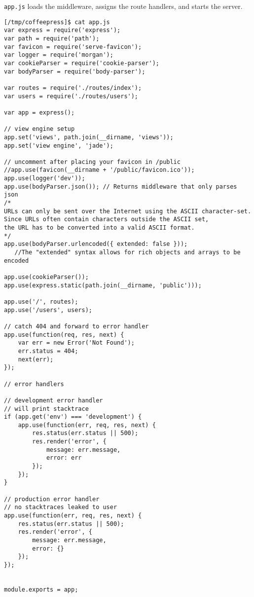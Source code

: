 
\verb|app.js| loads the middleware, assigns the route handlers, and starts the server. 

\begin{verbatim}
[/tmp/coffeepress]$ cat app.js
var express = require('express');
var path = require('path');
var favicon = require('serve-favicon');
var logger = require('morgan');
var cookieParser = require('cookie-parser');
var bodyParser = require('body-parser');

var routes = require('./routes/index');
var users = require('./routes/users');

var app = express();

// view engine setup
app.set('views', path.join(__dirname, 'views'));
app.set('view engine', 'jade');

// uncomment after placing your favicon in /public
//app.use(favicon(__dirname + '/public/favicon.ico'));
app.use(logger('dev'));
app.use(bodyParser.json()); // Returns middleware that only parses json
/* 
URLs can only be sent over the Internet using the ASCII character-set.
Since URLs often contain characters outside the ASCII set, 
the URL has to be converted into a valid ASCII format.
*/
app.use(bodyParser.urlencoded({ extended: false }));
   //The "extended" syntax allows for rich objects and arrays to be encoded 

app.use(cookieParser());
app.use(express.static(path.join(__dirname, 'public')));

app.use('/', routes);
app.use('/users', users);

// catch 404 and forward to error handler
app.use(function(req, res, next) {
    var err = new Error('Not Found');
    err.status = 404;
    next(err);
});

// error handlers

// development error handler
// will print stacktrace
if (app.get('env') === 'development') {
    app.use(function(err, req, res, next) {
        res.status(err.status || 500);
        res.render('error', {
            message: err.message,
            error: err
        });
    });
}

// production error handler
// no stacktraces leaked to user
app.use(function(err, req, res, next) {
    res.status(err.status || 500);
    res.render('error', {
        message: err.message,
        error: {}
    });
});


module.exports = app;
\end{verbatim}

